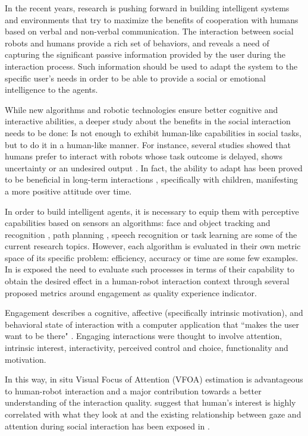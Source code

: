 \documentclass{sig-alternate}
\begin{document}
In the recent years, research is pushing forward in building intelligent systems and environments that try to maximize the benefits of cooperation with humans based on verbal and non-verbal communication. The interaction between social robots and humans provide a rich set of behaviors, and reveals a need of capturing the significant passive information provided by the user during the interaction process. Such information should be used to adapt the system to the specific user's needs in order to be able to provide a social or emotional intelligence to the agents. 

While new algorithms and robotic technologies ensure better cognitive and interactive abilities, a deeper study about the benefits in the social interaction needs to be done: Is not enough to exhibit human-like capabilities in social tasks, but to do it in a human-like manner. For instance, several studies showed that humans prefer to interact with robots whose task outcome is delayed, shows uncertainty or an undesired output \cite{Admoni,Short}. In fact, the ability to adapt has been proved to be beneficial in long-term interactions \cite{Tielman:2014, Lim:2014}, specifically with children, manifesting a more positive attitude over time.

In order to build intelligent agents, it is necessary to equip them with perceptive capabilities based on sensors an algorithms: face and object tracking and recognition \cite{Zhao:2003, Jafri:2014}, path planning \cite{Galceran:2013}, speech recognition \cite{brick2007incremental} or task learning \cite{calinon2007learning} are some of the current research topics. However, each algorithm is evaluated in their own metric space of its specific problem: efficiency, accuracy or time are some few examples. In \cite{anzalone} is exposed the need to evaluate such processes in terms of their capability to obtain the desired effect in a human-robot interaction context through several proposed metrics around engagement as quality experience indicator.

Engagement describes a cognitive, affective (specifically intrinsic motivation), and behavioral state of interaction with a computer application that ``makes the user want to be there" \cite{OBrien:2010}. Engaging interactions were thought to involve attention, intrinsic interest, interactivity, perceived control and choice, functionality and motivation.

In this way, in situ Visual Focus of Attention (VFOA) estimation is advantageous to human-robot interaction and a major contribution towards a better understanding of the interaction quality. \cite{yarbus1967eye, barber1976perception} suggest that human's interest is highly correlated with what they look at and the existing relationship between gaze and attention during social interaction has been exposed in \cite{argyle1969social}.
\end{document}
